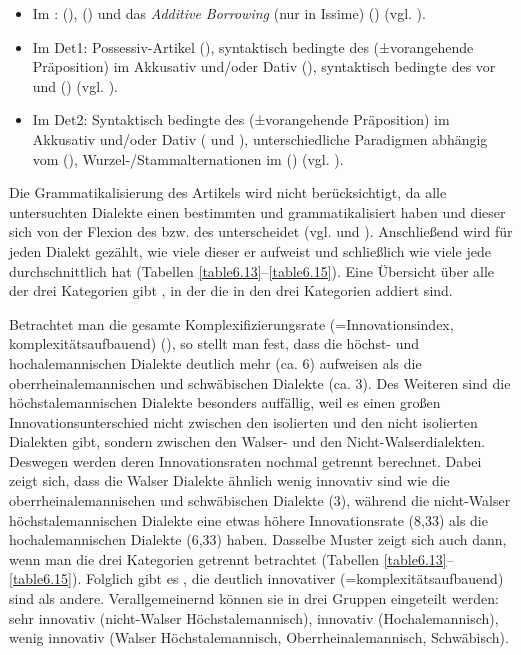 \begin{itemize}
\item
Im :  (),  () und das \textit{Additive Borrowing} (nur in Issime) () (vgl. ).
\item
Im Det1: Possessiv-Artikel (), syntaktisch bedingte  des  (±vorangehende Präposition) im Akkusativ und/oder Dativ (), syntaktisch bedingte  des  vor  und  () (vgl. ).
\item
Im Det2: Syntaktisch bedingte  des  (±vorangehende Präposition) im Akkusativ und/oder Dativ ( und ), unterschiedliche Paradigmen abhängig vom  (), Wur\-zel-/Stamm\-al\-ter\-na\-tio\-nen im  () (vgl. ).
\end{itemize}

Die Grammatikalisierung des Artikels wird nicht berücksichtigt, da alle untersuchten Dialekte einen bestimmten und  grammatikalisiert haben und dieser sich von der Flexion des  bzw. des  unterscheidet (vgl.  und ). Anschließend wird für jeden Dialekt gezählt, wie viele dieser  er aufweist und schließlich wie viele  jede  durchschnittlich hat (Tabellen \ref{table6.13}–\ref{table6.15}). Eine Übersicht über alle  der drei Kategorien gibt , in der die  in den drei Kategorien addiert sind.

Betrachtet man die gesamte Komplexifizierungsrate (=Innovationsindex, komplexitätsaufbauend) (), so stellt man fest, dass die höchst- und hochalemannischen Dialekte deutlich mehr  (ca. 6) aufweisen als die oberrheinalemannischen und schwäbischen Dialekte (ca. 3). Des Weiteren sind die höchstalemannischen Dialekte besonders auffällig, weil es einen großen Innovationsunterschied nicht zwischen den isolierten und den nicht isolierten Dialekten gibt, sondern zwischen den Walser- und den Nicht-Wal\-ser\-di\-a\-lek\-ten. Deswegen werden deren Innovationsraten nochmal getrennt berechnet. Dabei zeigt sich, dass die Walser Dialekte ähnlich wenig innovativ sind wie die oberrheinalemannischen und schwäbischen Dialekte (3), während die nicht-Walser höchstalemannischen Dialekte eine etwas höhere Innovationsrate (8,33) als die hochalemannischen Dialekte (6,33) haben. Dasselbe Muster zeigt sich auch dann, wenn man die drei Kategorien getrennt betrachtet (Tabellen \ref{table6.13}–\ref{table6.15}). Folglich gibt es , die deutlich innovativer (=komplexitätsaufbauend) sind als andere. Verallgemeinernd können sie in drei Gruppen eingeteilt werden: sehr innovativ (nicht-Walser Höchstalemannisch), innovativ (Hochalemannisch), wenig innovativ (Walser Höchstalemannisch, Oberrheinalemannisch, Schwäbisch).

